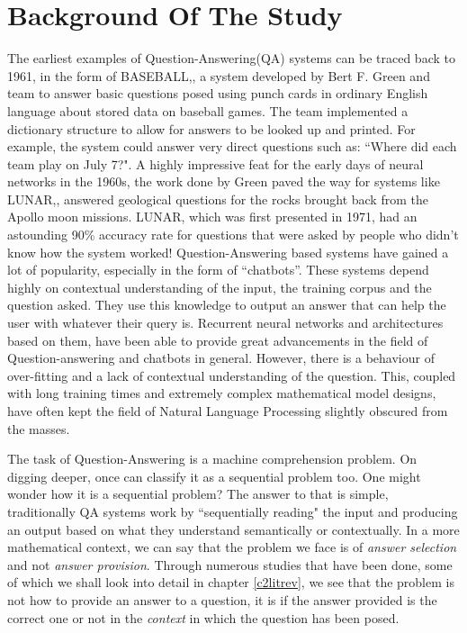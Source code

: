 \documentclass[a4paper,12pt]{report}
\begin{document}
        \section{Background Of The Study}\label{c11}
		    The earliest examples of Question-Answering(QA) systems can be traced back to 1961, in the form of BASEBALL,\citep{green1961baseball}, a system developed by Bert F. Green and team to answer basic questions posed using punch cards in ordinary English language about stored data on baseball games. The team implemented a dictionary structure to allow for answers to be looked up and printed. For example, the system could answer very direct questions such as: ``Where did each team play on July 7?".
		    A highly impressive feat for the early days of neural networks in the 1960s, the work done by Green paved the way for systems like LUNAR,\citep{lunar}, answered geological questions for the rocks brought back from the Apollo moon missions. LUNAR, which was first presented in 1971, had an astounding 90\% accuracy rate for questions that were asked by people who didn't know how the system worked!
		    Question-Answering based systems have gained a lot of popularity, especially in the form of ``chatbots''. These systems depend highly on contextual understanding of the input, the training corpus and the question asked. They use this knowledge to output an answer that can help the user with whatever their query is. Recurrent neural networks and architectures based on them, have been able to provide great advancements in the field of Question-answering and chatbots in general. However, there is a behaviour of over-fitting and a lack of contextual understanding of the question. This, coupled with long training times and extremely complex mathematical model designs, have often kept the field of Natural Language Processing slightly obscured from the masses.

		    The task of Question-Answering is a machine comprehension problem. On digging deeper, once can classify it as a sequential problem too. One might wonder how it is a sequential problem? The answer to that is simple, traditionally QA systems work by ``sequentially reading" the input and producing an output based on what they understand semantically or contextually.
		    In a more mathematical context, we can say that the problem we face is of \textit{answer selection} and not \textit{answer provision}. Through numerous studies that have been done, some of which we shall look into detail in chapter \ref{c2litrev}, we see that the problem is not how to provide an answer to a question, it is if the answer provided is the correct one or not in the \textit{context} in which the question has been posed.
\end{document}
